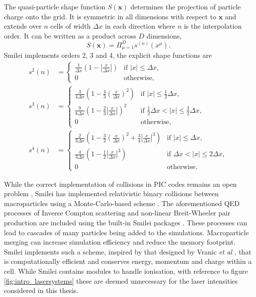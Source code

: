 The quasi-particle shape function $S(\mathbf{x})$ determines the projection of particle charge onto the grid. It is symmetric in all dimensions with respect to $\mathbf{x}$ and extends over $n$ cells of width $\Delta x$ in each direction where $n$ is the interpolation order. It can be written as a product across $D$ dimensions,
\begin{equation}
	S(\mathbf{x}) = \Pi^D_{\mu = 1}s^{(n)}(x^\mu).
\end{equation}
Smilei implements orders 2, 3 and 4, the explicit shape functions are
\begin{subequations}
	\begin{align}
		s^2 (n) &= \begin{cases}
			\frac{1}{\Delta x}\left(1-\left|\frac{x}{\Delta x}\right| \right)  & \text{if } |x| \le \Delta x, \\
			0  & \text{otherwise,}
		\end{cases} \\
		s^3(n) &= \begin{cases}
			\frac{3}{4\Delta x}\left(1-\frac{4}{3}\left(\frac{x}{\Delta x}\right)^2 \right)  & \text{if } |x| \le \frac{1}{2}\Delta x, \\
			\frac{9}{8\Delta x}\left(1-\frac{2}{3}\left|\frac{x}{\Delta x}\right| \right)^2  & \text{if } \frac{1}{2}\Delta x <|x| \le \frac{3}{2} \Delta x, \\
			0  & \text{otherwise,}
		\end{cases}  \\
		s^4(n) &= \begin{cases}
			\frac{2}{3 \Delta x}\left( 1-\frac{3}{2}\left(\frac{x}{\Delta x}\right)^2 + \frac{3}{4}\left| \frac{x}{\Delta x}\right| ^3 \right)  & \text{if } |x| \le \Delta x, \\
			\frac{4}{3 \Delta x}\left(1-\frac{1}{2}\left|\frac{x}{\Delta x}\right| ^3 \right)  & \text{if } \Delta x <|x| \le 2\Delta x, \\
			0  & \text{otherwise.}
		\end{cases} 
	\end{align}
\end{subequations}

While the correct implementation of collisions in PIC codes remains an open problem \cite{Collisions}, Smilei has implemented relativistic binary collisions between macroparticles using a Monte-Carlo-based scheme \cite{perezImprovedModelingRelativistic2012}. The aforementioned QED processes of Inverse Compton scattering and non-linear Breit-Wheeler pair production are included using the built-in Smilei packages \cite{derouillatSmileiCollaborativeOpensource2018}. These processes can lead to cascades of many particles being added to the simulations. Macroparticle merging can increase simulation efficiency and reduce the memory footprint. Smilei implements such a scheme, inspired by that designed by Vranic \textit{et al} \cite{vranicParticleMergingAlgorithm2015}, that is computationally efficient and conserves energy, momentum and charge within a cell. While Smilei contains modules to handle ionisation, with reference to figure \ref{fig:intro_lasersystems} these are deemed unnecessary for the laser intensities considered in this thesis.

